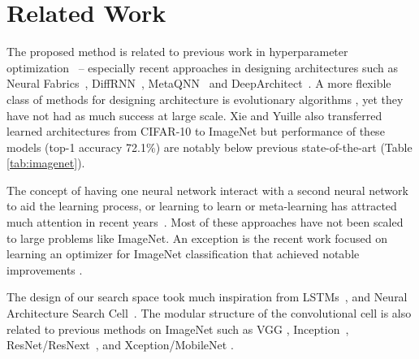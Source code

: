 \documentclass[10pt,twocolumn,letterpaper]{article}
\begin{document}
\section{Related Work}

The proposed method is related to previous work in hyperparameter optimization~\cite{pinto2009high,bergstra2011algorithms,bergstra2012random,snoek2012practical,snoek2015scalable,bergstra2013making,mendoza2016towards} -- especially recent approaches in designing architectures such as Neural Fabrics~\cite{saxena2016convolutional}, DiffRNN~\cite{miconi2016}, MetaQNN~\cite{baker2016designing} and DeepArchitect~\cite{negrinho2017}.  A more flexible class of methods for designing architecture  is evolutionary algorithms \cite{wierstra2005modeling,floreano2008neuroevolution,stanley2009hypercube,jozefowicz2015empirical,real2017large,miikkulainen2017evolving,xie17}, yet they have not had as much success at large scale. 
Xie and Yuille \cite{xie17} also transferred learned architectures from CIFAR-10 to ImageNet but performance of these models (top-1 accuracy 72.1\%) are notably below previous state-of-the-art (Table \ref{tab:imagenet}).

The concept of having one neural network interact with a second neural network to aid the learning process, or learning to learn or meta-learning \cite{hochreiter2001learning,schaul10} has attracted much attention in recent years~\cite{andrychowicz2016learning,wang2016learning,duan2016rl,ha2016hypernetworks,li2017learning,ravi2017optimization,finn2017model}. Most of these approaches have not been scaled to large problems like ImageNet. An exception is the recent work focused on learning an optimizer for ImageNet classification that achieved notable improvements \cite{wichrowska2017learned}.

The design of our search space took much inspiration from LSTMs~\cite{lstm}, and Neural Architecture Search Cell~\cite{zoph2017neural}. The modular structure of the convolutional cell is also related to previous methods on ImageNet such as VGG \cite{simonyan2014very}, Inception~\cite{szegedy2015going,szegedy2016rethinking,szegedy2016inception}, ResNet/ResNext~\cite{he2015deep,xie2016aggregated}, and Xception/MobileNet \cite{chollet2016xception, howard2017mobilenets}.
\end{document}
